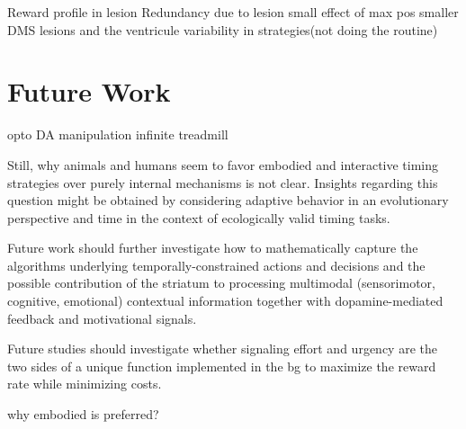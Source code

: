 Reward profile in lesion
Redundancy due to lesion
small effect of max pos
smaller DMS lesions and the ventricule
variability in strategies(not doing the routine)






\section{Future Work}

opto
DA manipulation
infinite treadmill

Still, why animals and humans seem to favor embodied and interactive timing strategies over purely internal mechanisms is not clear.
Insights regarding this question might be obtained by considering adaptive behavior in an evolutionary perspective\cite{Cisek2019} and time in the context of ecologically valid timing tasks\cite{vanRijn2018}.


Future work should further investigate how to mathematically capture the algorithms underlying temporally-constrained actions and decisions and the possible contribution of the striatum to processing multimodal (sensorimotor, cognitive, emotional) contextual information together with dopamine-mediated feedback and motivational signals.


Future studies should investigate whether signaling effort and urgency are the two sides of a unique function implemented in the \gls{bg} to maximize the reward rate while minimizing costs.




why embodied is preferred?